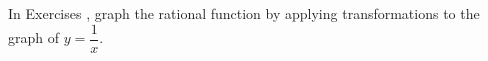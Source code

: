 {\noindent In Exercises}
{, graph the rational function by applying transformations to the graph of $y = \dfrac{1}{x}$.}
